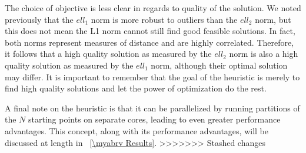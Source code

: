 The choice of objective is less clear in regards to quality of the solution. We noted previously that the $ell_1$ norm is more robust to outliers than the $ell_2$ norm, but this does not mean the L1 norm cannot still find good feasible solutions. In fact, both norms represent measures of distance and are highly correlated. Therefore, it follows that a high quality solution as measured by the $ell_2$ norm is also a high quality solution as measured by the $ell_1$ norm, although their optimal solution may differ. It is important to remember that the goal of the heuristic is merely to find high quality solutions and let the power of optimization do the rest. 

A final note on the heuristic is that it can be parallelized by running partitions of the $N$ starting points on separate cores, leading to even greater performance advantages. This concept, along with its performance advantages, will be discussed at length in \mysection~\ref{\myabrv Results}. 
>>>>>>> Stashed changes
